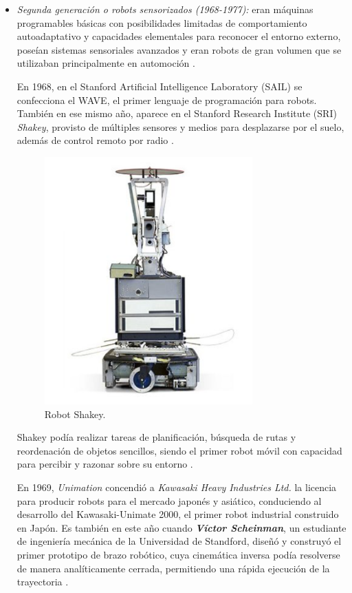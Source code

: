 \begin{itemize}
  \item \textit{Segunda generación o robots sensorizados (1968-1977):} eran máquinas programables básicas con posibilidades limitadas de comportamiento autoadaptativo y capacidades elementales para reconocer el entorno externo, poseían sistemas sensoriales avanzados y eran robots de gran volumen que se utilizaban principalmente en automoción \cite{Zamalloa17}.

  En 1968, en el Stanford Artificial Intelligence Laboratory (SAIL) se confecciona el WAVE, el primer lenguaje de programación para robots. También en ese mismo año, aparece en el Stanford Research Institute (SRI) \emph{Shakey}, provisto de múltiples sensores y medios para desplazarse por el suelo, además de control remoto por radio \cite{Sanchez07b}.
  
  \begin{figure} [h!]
    \begin{center}
      \includegraphics[width=8cm]{figs/Shakey.png}
    \end{center}
    \caption{Robot Shakey.}
    \label{fig:shakey}
  \end{figure}

  Shakey podía realizar tareas de planificación, búsqueda de rutas y reordenación de objetos sencillos, siendo el primer robot móvil con capacidad para percibir y razonar sobre su entorno \cite{sri}.
  
  \pagebreak
  
  En 1969, \emph{Unimation} concendió a \emph{Kawasaki Heavy Industries Ltd.} la licencia para producir robots para el mercado japonés y asiático,    		conduciendo al desarrollo del Kawasaki-Unimate 2000, el primer robot industrial construido en Japón. Es también en este año cuando \textbf{\emph{Víctor Scheinman}}, un estudiante de ingeniería mecánica de la Universidad de Standford, diseñó y construyó el primer prototipo de brazo robótico, cuya cinemática inversa podía resolverse de manera analíticamente cerrada, permitiendo una rápida ejecución de la trayectoria \cite{Gasparetto19}. 


\end{itemize}
